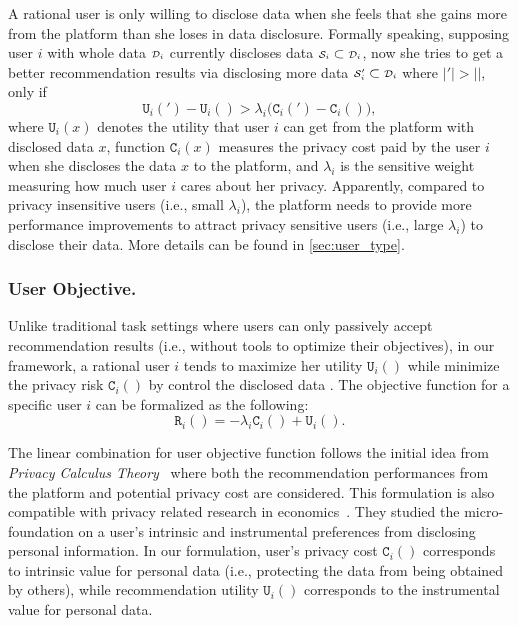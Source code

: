 A rational user is only willing to disclose data when she feels that she gains more from the platform than she loses in data disclosure.
Formally speaking, supposing user $i$ with whole data ${\scriptstyle \mathcal{D}_i}$ currently discloses data ${\scriptstyle \mathcal{S}_i} \subset {\scriptstyle \mathcal{D}_i}$, now she tries to get a better recommendation results via disclosing more data ${\scriptstyle \mathcal{S}_i'} \subset {\scriptstyle \mathcal{D}_i}$ where $|\si{'}| > |\si{}|$, only if
\begin{equation}
    \texttt{U}_i(\si{'}) - \texttt{U}_i(\si{}) > \lambda_i\bigl(\texttt{C}_i( \si{'}) -\texttt{C}_i( \si{})\bigr),
\label{eq:base}
\end{equation}
where $\texttt{U}_i(x)$ denotes the utility that user $i$ can get from the platform with disclosed data $x$, function $\texttt{C}_i(x)$ measures the privacy cost paid by the user $i$ when she discloses the data $x$ to the platform, and $\lambda_i$ is the sensitive weight measuring how much user $i$ cares about her privacy.
Apparently, compared to privacy insensitive users (i.e., small $\lambda_i$), the platform needs to provide more performance improvements to attract privacy sensitive users (i.e., large $\lambda_i$) to disclose their data.
More details can be found in \cref{sec:user_type}.


\subsubsection{\textbf{User Objective.}}
Unlike traditional task settings where users can only passively accept recommendation results (i.e., without tools to optimize their objectives), in our framework, a rational user $i$ tends to maximize her utility $\texttt{U}_i(\si{})$ while minimize the privacy risk $\texttt{C}_i(\si{})$ by control the disclosed data $\si{}$.
The objective function for a specific user $i$ can be formalized as the following:
\begin{equation}
    \texttt{R}_i(\si{}) = -\lambda_i \texttt{C}_i(\si{}) + \texttt{U}_i( \si{}).
\label{eq:framework}
\end{equation}

The linear combination for user objective function follows the initial idea from \textit{Privacy Calculus Theory}~\cite{Laufer:si77:Privacy,Culnan:os99:Information} where both the recommendation performances from the platform and potential privacy cost are considered.
This formulation is also compatible with privacy related research in economics~\cite{farrell2012can,jin2017protecting,lin2019valuing}. %
They studied the micro-foundation on a user's intrinsic and instrumental preferences from disclosing personal information.
In our formulation, user's privacy cost $\texttt{C}_i(\si{})$ corresponds to intrinsic value for personal data (i.e., protecting the data from being obtained by others), while recommendation utility $\texttt{U}_i(\si{})$ corresponds to the instrumental value for personal data.


